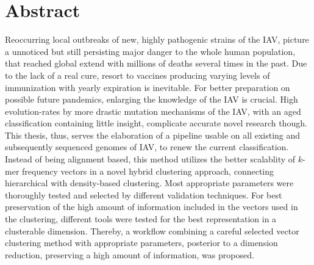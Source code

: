\chapter*{Abstract}

Reoccurring local outbreaks of new, highly pathogenic strains of the \gls{IAV}, picture a unnoticed but still persisting major danger to the whole human population, that reached global extend with millions of deaths several times in the past. Due to the lack of a real cure, resort to vaccines producing varying levels of immunization with yearly expiration is inevitable. For better preparation on possible future pandemics, enlarging the knowledge of the \gls{IAV} is crucial. High evolution-rates by more drastic mutation mechanisms of the \gls{IAV}, with an aged classification containing little insight, complicate accurate novel research though. This thesis, thus, serves the elaboration of a pipeline usable on all existing and subsequently sequenced genomes of \gls{IAV}, to renew the current classification. Instead of being alignment based, this method utilizes the better scalablity of $k$-mer frequency vectors in a novel hybrid clustering approach, connecting hierarchical with density-based clustering. Most appropriate parameters were thoroughly tested and selected by different validation techniques. For best preservation of the high amount of information included in the vectors used in the clustering, different tools were tested for the best representation in a clusterable dimension. Thereby, a workflow combining a careful selected vector clustering method with appropriate parameters, posterior to a dimension reduction, preserving a high amount of information, was proposed. 